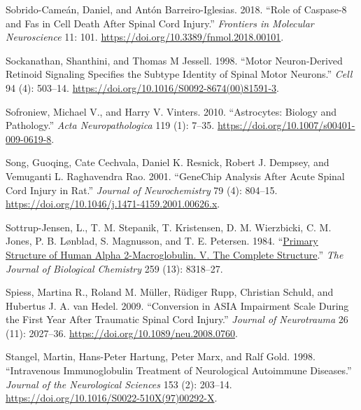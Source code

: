 \documentclass[9pt,lineno]{elife}
\newlength{\cslhangindent}
\newlength{\cslentryspacingunit} %
\newenvironment{CSLReferences}[2] %
 {%
  \setlength{\parindent}{0pt}
  \ifodd #1
  \let\oldpar\par
  \def\par{\hangindent=\cslhangindent\oldpar}
  \fi
  \setlength{\parskip}{#2\cslentryspacingunit}
 }%
 {}
\begin{document}
\begin{landscape}
\begin{landscape}
\begin{landscape}
\begin{landscape}
\begin{CSLReferences}{1}{0}
\leavevmode{}%
Sobrido-Cameán, Daniel, and Antón Barreiro-Iglesias. 2018. {``Role of {Caspase-8} and {Fas} in {Cell Death After Spinal Cord Injury}.''} \emph{Frontiers in Molecular Neuroscience} 11: 101. \url{https://doi.org/10.3389/fnmol.2018.00101}.

\leavevmode{}%
Sockanathan, Shanthini, and Thomas M Jessell. 1998. {``Motor {Neuron-Derived Retinoid Signaling Specifies} the {Subtype Identity} of {Spinal Motor Neurons}.''} \emph{Cell} 94 (4): 503--14. \url{https://doi.org/10.1016/S0092-8674(00)81591-3}.

\leavevmode{}%
Sofroniew, Michael V., and Harry V. Vinters. 2010. {``Astrocytes: Biology and Pathology.''} \emph{Acta Neuropathologica} 119 (1): 7--35. \url{https://doi.org/10.1007/s00401-009-0619-8}.

\leavevmode{}%
Song, Guoqing, Cate Cechvala, Daniel K. Resnick, Robert J. Dempsey, and Vemuganti L. Raghavendra Rao. 2001. {``{GeneChip} Analysis After Acute Spinal Cord Injury in Rat.''} \emph{Journal of Neurochemistry} 79 (4): 804--15. \url{https://doi.org/10.1046/j.1471-4159.2001.00626.x}.

\leavevmode{}%
Sottrup-Jensen, L., T. M. Stepanik, T. Kristensen, D. M. Wierzbicki, C. M. Jones, P. B. Lønblad, S. Magnusson, and T. E. Petersen. 1984. {``\href{https://www.ncbi.nlm.nih.gov/pubmed/6203908}{Primary Structure of Human Alpha 2-Macroglobulin. {V}. {The} Complete Structure}.''} \emph{The Journal of Biological Chemistry} 259 (13): 8318--27.

\leavevmode{}%
Spiess, Martina R., Roland M. Müller, Rüdiger Rupp, Christian Schuld, and Hubertus J. A. van Hedel. 2009. {``Conversion in {ASIA Impairment Scale} During the First Year After Traumatic Spinal Cord Injury.''} \emph{Journal of Neurotrauma} 26 (11): 2027--36. \url{https://doi.org/10.1089/neu.2008.0760}.

\leavevmode{}%
Stangel, Martin, Hans-Peter Hartung, Peter Marx, and Ralf Gold. 1998. {``Intravenous Immunoglobulin Treatment of Neurological Autoimmune Diseases.''} \emph{Journal of the Neurological Sciences} 153 (2): 203--14. \url{https://doi.org/10.1016/S0022-510X(97)00292-X}.


\end{CSLReferences}
\end{landscape}
\end{landscape}
\end{landscape}
\end{landscape}
\end{document}
